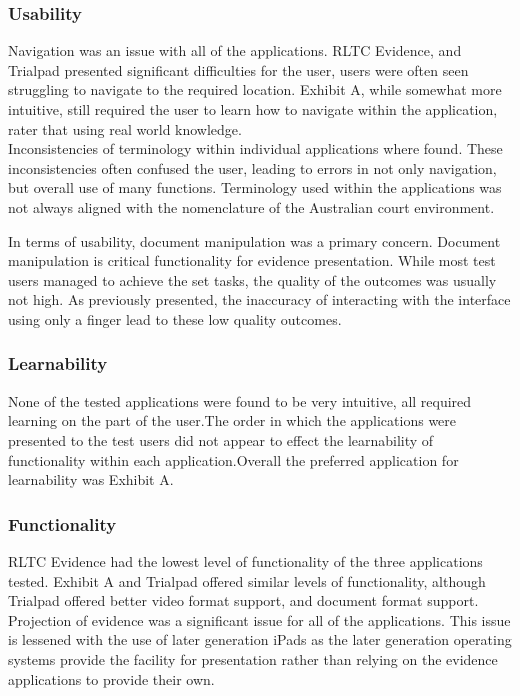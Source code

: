 \documentclass{article}
\begin{document}
\subsubsection{Usability}
Navigation was an issue with all of the applications. RLTC Evidence, and Trialpad presented significant difficulties for the user, users were often seen struggling to navigate to the required location. Exhibit A, while somewhat more intuitive, still required the user to learn how to navigate within the application, rater that using real world knowledge. \\
Inconsistencies of terminology within individual applications where found. These inconsistencies often confused the user, leading to errors in not only navigation, but overall use of many functions. Terminology used within the applications was not always aligned with the nomenclature of the Australian court environment.




In terms of usability, document manipulation was a primary concern. Document manipulation is critical functionality for evidence presentation. While most test users managed to achieve the set tasks, the quality of the outcomes was usually not high. As previously presented, the inaccuracy of interacting with the interface using only a finger lead to these low quality outcomes.
\subsubsection{Learnability}
None of the tested applications were found to be very intuitive, all required learning on the part of the user.The order in which the applications were presented to the test users did not appear to effect the learnability of functionality within each application.Overall the preferred application for learnability was Exhibit A.
\subsubsection{Functionality}
RLTC Evidence had the lowest level of functionality of the three applications tested. Exhibit A and Trialpad offered similar levels of functionality, although Trialpad offered better video format support, and document format support.\\
Projection of evidence was a significant issue for all of the applications. This issue is lessened with the use of later generation iPads as the later generation operating systems provide the facility for presentation rather than relying on the evidence applications to provide their own.\\
\end{document}
